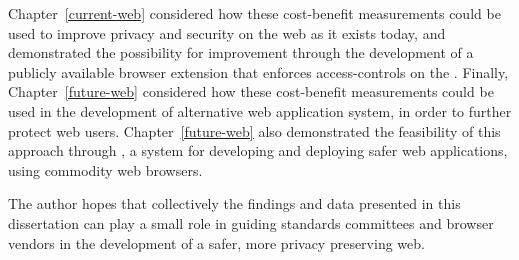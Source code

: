 Chapter~\ref{current-web} considered how these cost-benefit measurements could
be used to improve privacy and security on the web as it exists today, and
demonstrated the possibility for improvement through the development of a
publicly available browser extension that enforces access-controls on
the \WAPI.  Finally, Chapter~\ref{future-web} considered how these cost-benefit
measurements could be used in the development of alternative web application
system, in order to further protect web users.  Chapter~\ref{future-web} also
demonstrated the feasibility of this approach through \CDF, a system for
developing and deploying safer web applications, using commodity web browsers.

The author hopes that collectively the findings and data presented in this
dissertation can play a small role in guiding standards committees and browser
vendors in the development of a safer, more privacy preserving web.
